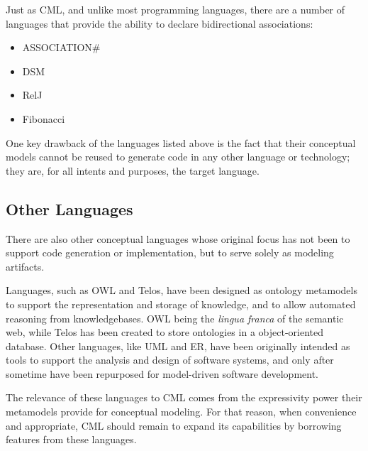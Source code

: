 Just as CML,
and unlike most programming languages,
there are a number of languages that provide the ability to declare bidirectional associations:

\begin{itemize}
\item ASSOCIATION\# \cite{cardoso}
\item DSM \cite{balzer}
\item RelJ \cite{bierman}
\item Fibonacci \cite{fibonacci}
\end{itemize}

One key drawback of the languages listed above is the fact that their conceptual models
cannot be reused to generate code in any other language or technology;
they are, for all intents and purposes, the target language.

\subsection{Other Languages}

There are also other conceptual languages whose original focus has not been to support code generation or implementation,
but to serve solely as modeling artifacts.

Languages, such as OWL and Telos, have been designed as ontology metamodels
to support the representation and storage of knowledge,
and to allow automated reasoning from knowledgebases.
OWL being the \emph{lingua franca} of the semantic web,
while Telos has been created to store ontologies in a object-oriented database.
Other languages, like UML and ER, have been originally intended as tools to support the analysis and design of software systems, and only after sometime have been repurposed for model-driven software development.

The relevance of these languages to CML comes from the expressivity power their metamodels provide for conceptual modeling. For that reason, when convenience and appropriate, CML should remain to expand its capabilities by borrowing features from these languages.
